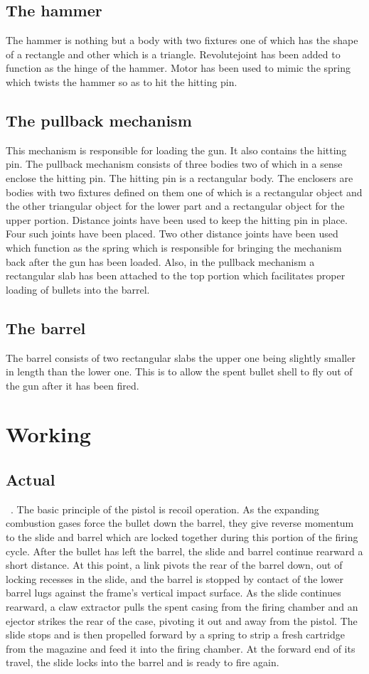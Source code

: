 \documentclass [11pt]{report}
\begin{document}
\subsection{The hammer}
The hammer is nothing but a body with two fixtures one of which has the shape of a rectangle and other which is a triangle. Revolutejoint has been added to function as the hinge of the hammer. Motor has been used to mimic the spring which twists the hammer so as to hit the hitting pin.
\subsection{The pullback mechanism}
This mechanism is responsible for loading the gun. It also contains the hitting pin. The pullback mechanism consists of three bodies two of which in a sense enclose the hitting pin. The hitting pin is a rectangular body. The enclosers are bodies with two fixtures defined on them one of which is a rectangular object and the other triangular object for the lower part and a rectangular object for the upper portion. Distance joints have been used to keep the hitting pin in place. Four such joints have been placed. Two other distance joints have been used which function as the spring which is responsible for bringing the mechanism back after the gun has been loaded.
Also, in the pullback mechanism a rectangular slab has been attached to the top portion which facilitates proper loading of bullets into the barrel.
\subsection{The barrel}
The barrel consists of two rectangular slabs the upper one being slightly smaller in length than the lower one. This is to allow the spent bullet shell to fly out of the gun after it has been fired.



\section{Working}
\subsection{Actual}
~\cite{utubeanim}.
The basic principle of the pistol is recoil operation. As the expanding combustion gases force the bullet down the barrel, they give reverse momentum to the slide and barrel which are locked together during this portion of the firing cycle. After the bullet has left the barrel, the slide and barrel continue rearward a short distance.
At this point, a link pivots the rear of the barrel down, out of locking recesses in the slide, and the barrel is stopped by contact of the lower barrel lugs against the frame's vertical impact surface. As the slide continues rearward, a claw extractor pulls the spent casing from the firing chamber and an ejector strikes the rear of the case, pivoting it out and away from the pistol. The slide stops and is then propelled forward by a spring to strip a fresh cartridge from the magazine and feed it into the firing chamber. At the forward end of its travel, the slide locks into the barrel and is ready to fire again. 
\end{document}
